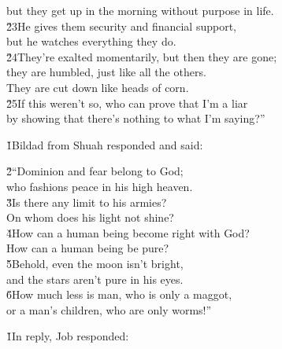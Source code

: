 \begin{poetry}
\poemll    but they get up in the morning without purpose in life. \\
\poeml \v{23}He gives them security and financial support, \\
\poemll    but he watches everything they do. \\
\poeml \v{24}They're exalted momentarily, but then they are gone; \\
\poemll    they are humbled, just like all the others. \\
\poemlll       They are cut down like heads of corn. \\
\poeml \v{25}If this weren't so, who can prove that I'm a liar \\
\poemll    by showing that there's nothing to what I'm saying?''
\end{poetry}

\v{1}Bildad from Shuah responded and said:

\begin{poetry}
\poeml \v{2}``Dominion and fear belong to God; \\
\poemll    who fashions peace in his high heaven. \\
\poeml \v{3}Is there any limit to his armies? \\
\poemll    On whom does his light not shine? \\
\poeml \v{4}How can a human being become right with God? \\
\poemll    How can a human being be pure? \\
\poeml \v{5}Behold, even the moon isn't bright, \\
\poemll    and the stars aren't pure in his eyes. \\
\poeml \v{6}How much less is man, who is only a maggot, \\
\poemll    or a man's children, who are only worms!''
\end{poetry}

\v{1}In reply, Job responded:

